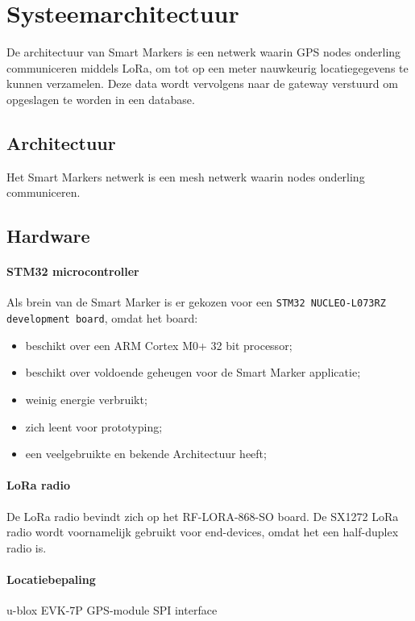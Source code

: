 \section{Systeemarchitectuur}
De architectuur van Smart Markers is een netwerk waarin GPS nodes onderling communiceren middels LoRa, om tot op een meter nauwkeurig locatiegegevens te kunnen verzamelen. Deze data wordt vervolgens naar de gateway verstuurd om opgeslagen te worden in een database.

\subsection{Architectuur}
Het Smart Markers netwerk is een mesh netwerk waarin nodes onderling communiceren.

\subsection{Hardware}
\paragraph{STM32 microcontroller} \hfill \break
Als brein van de Smart Marker is er gekozen voor een \texttt{STM32 NUCLEO-L073RZ development board}, omdat het board:
\begin{itemize}
    \item beschikt over een ARM Cortex M0+ 32 bit processor;
    \item beschikt over voldoende geheugen voor de Smart Marker applicatie;
    \item weinig energie verbruikt;
    \item zich leent voor prototyping;
    \item een veelgebruikte en bekende Architectuur heeft;
\end{itemize}

\paragraph{LoRa radio} \hfill \break
De LoRa radio bevindt zich op het RF-LORA-868-SO board. De SX1272 LoRa radio wordt voornamelijk gebruikt voor end-devices, omdat het een half-duplex radio is.

\paragraph{Locatiebepaling} \hfill \break
u-blox EVK-7P GPS-module
    SPI interface

